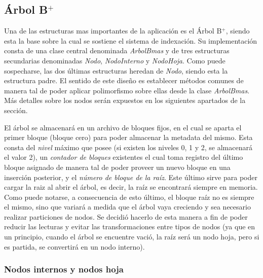 \documentclass{article}
\begin{document}
\subsection{Árbol B$^+$}
\medskip

	Una de las estructuras mas importantes de la aplicación es el Árbol B$^+$, siendo esta la base sobre la cual se sostiene el sistema de indexación. Su implementación consta de una clase central denominada \textit{ArbolBmas} y de tres estructuras secundarias denominadas \textit{Nodo}, \textit{NodoInterno} y \textit{NodoHoja}. Como puede sospecharse, las dos últimas estructuras heredan de \textit{Nodo}, siendo esta la estructura padre. El sentido de este diseño es establecer métodos comunes de manera tal de poder aplicar polimorfismo sobre ellas desde la clase \textit{ArbolBmas}. Más detalles sobre los nodos serán expuestos en los siguientes apartados de la sección.
	\par
	El árbol se almacenará en un archivo de bloques fijos, en el cual se aparta el primer bloque (bloque cero) para poder almacenar la metadata del mismo. Esta consta del \textit{nivel} máximo que posee (si existen los niveles 0, 1 y 2, se almacenará el valor 2), un \textit{contador de bloques} existentes el cual toma registro del último bloque asignado de manera tal de poder proveer un nuevo bloque en una inserción posterior, y el \textit{número de bloque de la raíz}. Este último sirve para poder cargar la raiz al abrir el árbol, es decir, la raíz se encontrará siempre en memoria. Como puede notarse, a consecuencia de esto último, el bloque raíz no es siempre el mismo, sino que variará a medida que el árbol vaya creciendo y sea necesario realizar particiones de nodos. Se decidió hacerlo de esta manera a fin de poder reducir las lecturas y evitar las transformaciones entre tipos de nodos (ya que en un principio, cuando el árbol se encuentre vació, la raíz será un nodo hoja, pero si es partida, se convertirá en un nodo interno).
\bigskip



\subsubsection{Nodos internos y nodos hoja}
	
\end{document}
